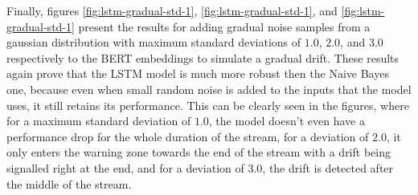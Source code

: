 \documentclass[12pt]{extreport}
\begin{document}
Finally, figures \ref{fig:lstm-gradual-std-1}, \ref{fig:lstm-gradual-std-1}, and \ref{fig:lstm-gradual-std-1} present the results for adding gradual noise samples from a gaussian distribution with maximum standard deviations of $1.0$, $2.0$, and $3.0$ respectively to the BERT embeddings to simulate a gradual drift. These results again prove that the LSTM model is much more robust then the Naive Bayes one, because even when small random noise is added to the inputs that the model uses, it still retains its performance. This can be clearly seen in the figures, where for a maximum standard deviation of $1.0$, the model doesn't even have a performance drop for the whole duration of the stream, for a deviation of $2.0$, it only enters the warning zone towards the end of the stream with a drift being signalled right at the end, and for a deviation of $3.0$, the drift is detected after the middle of the stream.
\end{document}
